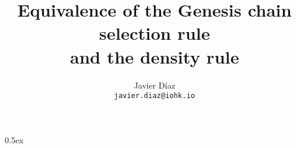 \documentclass[a4paper,11pt]{article}
\begin{document}
\title{Equivalence of the Genesis chain selection rule \\ and the density rule}
\author{Javier D\'iaz\\\small\texttt{javier.diaz@iohk.io}}

\maketitle

\tableofcontents

\parindent 0pt\parskip 0.5ex






\end{document}
